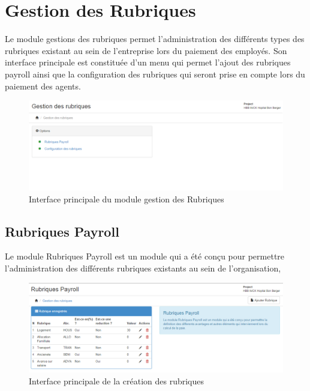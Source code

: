 \documentclass[12pt,a4paper]{report}
\begin{document}
\section{Gestion des Rubriques}
Le module gestions des rubriques permet l'administration des différents types des rubriques existant au sein de l'entreprise lors du paiement des employés. Son interface principale est constituée d'un menu qui permet l'ajout des rubriques payroll ainsi que la configuration des rubriques qui seront prise en compte lors du paiement des agents.
\begin{figure}[h]
\begin{center}
\includegraphics[width=14cm]{pic/GestRubriques.png}
\end{center}
\caption{Interface principale du module gestion des Rubriques}
\label{Interface principale du module gestion des Rubriques}
\end{figure}

\subsection{Rubriques Payroll}
Le module Rubriques Payroll est un module qui a été conçu pour permettre l'administration des différents rubriques existants au sein de l'organisation,
\begin{figure}[h]
\begin{center}
\includegraphics[width=14cm]{pic/RubPayroll.png}
\end{center}
\caption{Interface principale de la création des rubriques}
\label{Interface principale de la création des rubriques}
\end{figure}
\end{document}
